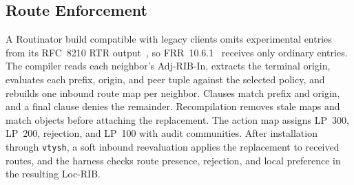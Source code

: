 \subsection{Route Enforcement}
\label{sec:impl-enforcement}

A Routinator build compatible with legacy clients omits experimental entries from its RFC~8210 RTR output~\cite{rfc8210}, so FRR~10.6.1~\cite{frr} receives only ordinary entries. The compiler reads each neighbor's Adj-RIB-In, extracts the terminal origin, evaluates each prefix, origin, and peer tuple against the selected policy, and rebuilds one inbound route map per neighbor. Clauses match prefix and origin, and a final clause denies the remainder. Recompilation removes stale maps and match objects before attaching the replacement. The action map assigns \explicit{} LP~300, \openscope{} LP~200, \invalid{} rejection, and \notfound{} LP~100 with audit communities. After installation through \texttt{vtysh}, a soft inbound reevaluation applies the replacement to received routes, and the harness checks route presence, rejection, and local preference in the resulting Loc-RIB.
